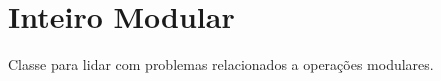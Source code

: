 
    
    \section{Inteiro Modular}
    Classe para lidar com problemas relacionados a operações modulares.
    
